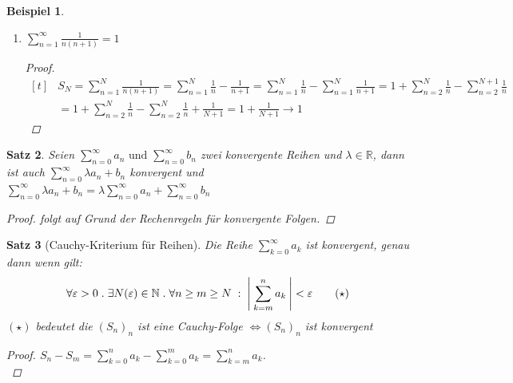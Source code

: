 \documentclass[a4paper,titlepage,oneside]{article}
\def\N{\ensuremath{\mathbb{N}} }
\def\R{\ensuremath{\mathbb{R}} }
\renewcommand{\epsilon}{\ensuremath{\varepsilon} }
\def\sp{\hspace{0,1cm}}
\def\spdot{\sp.\sp}
\def\spcolon{\sp:\sp}
\newcommand{\suminf}[2][n]{\ensuremath{\sum_{#1= 0}^{\infty}{#2}}}
\newcommand{\Suminf}[2][n]{\ensuremath{\sum_{#1=1}^{\infty}{#2}}}
\newcommand{\abs}[1]{\ensuremath{\left|\:#1\:\right|}}
\theoremstyle{thmstyle}
\newtheorem{satz}{Satz}[section]
\newtheorem{bsp}[satz]{Beispiel}
\theoremstyle{subthmstyle}
\begin{document}
\begin{bsp}
\begin{enumerate}
\begin{proof}
Würde \((S_N)\) konvergieren, dann auch die Teilfolge \((S_{2^N})\), da diese divergiert, divergiert auch \((S_N)\)\\
\end{proof}

\item $ \displaystyle \Suminf{\frac{1}{n(n+1)}}= 1 $

\begin{proof}
\begin{math}\displaystyle \begin{aligned}[t]
&S_N = \sum_{n=1}^{N}{\frac{1}{n(n+1)}} = \sum_{n=1}^{N}{\frac{1}{n}} - \frac{1}{n+1} = \sum_{n=1}^{N}{\frac{1}{n}} - \sum_{n=1}^{N}{\frac{1}{n+1}}
= 1 + \sum_{n=2}^{N}{\frac{1}{n}} - \sum_{n=2}^{N+1}{\frac{1}{n}} \\
&= 1 + \sum_{n=2}^{N}{\frac{1}{n}} - \sum_{n=2}^{N}{\frac{1}{n}} + \frac{1}{N+1}
= 1 + \frac{1}{N+1} \longrightarrow 1
\end{aligned}\end{math}\\ 
\end{proof}

\end{enumerate}
\end{bsp}

\begin{satz}
Seien $ \displaystyle \suminf{a_n} \text{ und } \suminf{b_n}$ zwei konvergente Reihen und \(\lambda \in \R\),
dann ist auch $ \displaystyle \suminf{\lambda a_n + b_n}$ konvergent und $ \displaystyle \suminf{\lambda a_n + b_n} = \lambda \suminf{a_n} + \suminf{b_n}$
\begin{proof}
folgt auf Grund der Rechenregeln für konvergente Folgen.
\end{proof}
\end{satz}

\begin{satz}[Cauchy-Kriterium für Reihen]
Die Reihe $ \displaystyle \suminf[k]{a_k}$ ist konvergent, genau dann wenn gilt:
\[\forall \epsilon > 0 \spdot \exists N(\epsilon) \in \N \spdot \forall n \ge m \ge N \spcolon \abs{\sum_{k=m}^{n}{a_k}} < \epsilon \qquad (\star)\]
\((\star)\) bedeutet die \((S_n)_n\) ist eine Cauchy-Folge \(\Leftrightarrow (S_n)_n\) ist konvergent
\begin{proof}
$ \displaystyle S_n - S_m = \sum_{k=0}^{n}{a_k} - \sum_{k=0}^{m}{a_k} = \sum_{k=m}^{n}{a_k}$.\\
\end{proof}
\end{satz}
\end{document}
